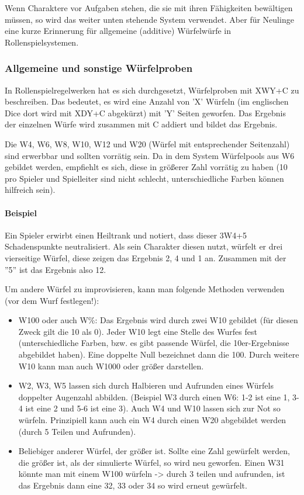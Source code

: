 \documentclass{article}
\begin{document}
Wenn Charaktere vor Aufgaben stehen, die sie mit ihren Fähigkeiten bewältigen müssen, so wird das weiter unten stehende
System verwendet. Aber für Neulinge eine kurze Erinnerung für allgemeine (additive) Würfelwürfe in Rollenspielsystemen.

\subsubsection{Allgemeine und sonstige Würfelproben}

In Rollenspielregelwerken hat es sich durchgesetzt, Würfelproben mit XWY+C zu beschreiben. Das bedeutet, es wird eine
Anzahl von 'X' Würfeln (im englischen Dice dort wird mit XDY+C abgekürzt) mit 'Y' Seiten geworfen. Das Ergebnis der
einzelnen Würfe wird zusammen mit C addiert und bildet das Ergebnis.

Die W4, W6, W8, W10, W12 und W20 (Würfel mit entsprechender Seitenzahl) sind erwerbbar und sollten vorrätig sein.
Da in dem System Würfelpools aus W6 gebildet werden, empfiehlt es sich, diese in größerer Zahl vorrätig zu haben
(10 pro Spieler und Spielleiter sind nicht schlecht, unterschiedliche Farben können hilfreich sein).

\paragraph{Beispiel}

Ein Spieler erwirbt einen Heiltrank und notiert, dass dieser 3W4+5 Schadenspunkte neutralisiert. Als sein Charakter
diesen nutzt, würfelt er drei vierseitige Würfel, diese zeigen das Ergebnis 2, 4 und 1 an. Zusammen mit der ''5'' ist
das Ergebnis also 12.

Um andere Würfel zu improvisieren, kann man folgende Methoden verwenden (vor dem Wurf festlegen!):

\begin{itemize}
\item W100 oder auch W\%: Das Ergebnis wird durch zwei W10 gebildet (für diesen Zweck gilt die 10 als 0). Jeder W10 legt eine Stelle des Wurfes fest (unterschiedliche Farben, bzw. es gibt passende Würfel, die 10er-Ergebnisse abgebildet haben). Eine doppelte Null bezeichnet dann die 100. Durch weitere W10 kann man auch W1000 oder größer darstellen.
\item W2, W3, W5 lassen sich durch Halbieren und Aufrunden eines Würfels doppelter Augenzahl abbilden. (Beispiel W3 durch einen W6: 1-2 ist eine 1, 3-4 ist eine 2 und 5-6 ist eine 3). Auch W4 und W10 lassen sich zur Not so würfeln. Prinzipiell kann auch ein W4 durch einen W20 abgebildet werden (durch 5 Teilen und Aufrunden).
\item Beliebiger anderer Würfel, der größer ist. Sollte eine Zahl gewürfelt werden, die größer ist, als der simulierte Würfel, so wird neu geworfen. Einen W31 könnte man mit einem W100 würfeln -> durch 3 teilen und aufrunden, ist das Ergebnis dann eine 32, 33 oder 34 so wird erneut gewürfelt.
\end{itemize}
\end{document}
